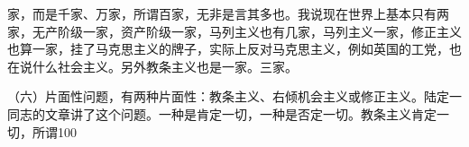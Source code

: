 家，而是千家、万家，所谓百家，无非是言其多也。我说现在世界上基本只有两家，无产阶级一家，资产阶级一家，马列主义也有几家，马列主义一家，修正主义也算一家，挂了马克思主义的牌子，实际上反对马克思主义，例如英国的工党，也在说什么社会主义。另外教条主义也是一家。三家。

（六）片面性问题，有两种片面性：教条主义、右倾机会主义或修正主义。陆定一同志的文章讲了这个问题。一种是肯定一切，一种是否定一切。教条主义肯定一切，所谓100%

